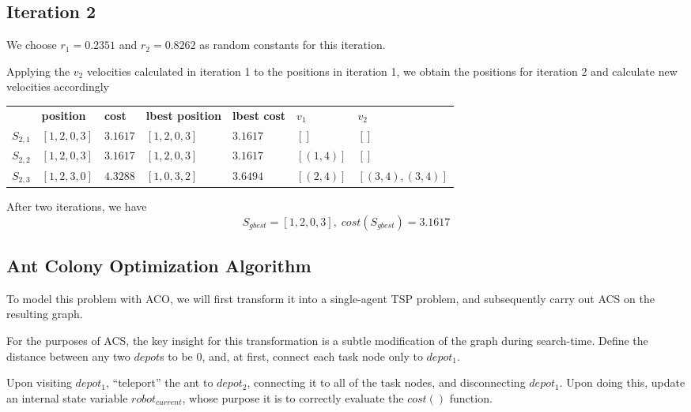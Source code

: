 \documentclass[a4paper]{article}
\begin{document}
\subsection{Iteration 2}

We choose $r_1 = 0.2351$ and $r_2 = 0.8262$ as random constants for this
iteration.

Applying the $v_2$ velocities calculated in iteration 1 to the positions in
iteration 1, we obtain the positions for iteration 2 and calculate new
velocities accordingly
\begin{center}
\begin{tabular}{lllllll}
          & \textbf{position} & \textbf{cost} & \textbf{lbest position} & \textbf{lbest cost} & $v_1$      & $v_2$            \\
$S_{2,1}$ & $[1, 2, 0, 3]$    & $3.1617$      & $[1, 2, 0, 3]$          & $3.1617$            & $[]      $ & $[]$             \\
$S_{2,2}$ & $[1, 2, 0, 3]$    & $3.1617$      & $[1, 2, 0, 3]$          & $3.1617$            & $[(1, 4)]$ & $[]$             \\
$S_{2,3}$ & $[1, 2, 3, 0]$    & $4.3288$      & $[1, 0, 3, 2]$          & $3.6494$            & $[(2, 4)]$ & $[(3,4), (3,4)]$ \\
\end{tabular}
\end{center}
\vspace{1.5em}

After two iterations, we have
$$S_\mathit{gbest} = [1, 2, 0, 3], \; cost(S_\mathit{gbest}) = 3.1617$$

\subsection{Ant Colony Optimization Algorithm} %

To model this problem with ACO, we will first transform it into a single-agent
TSP problem, and subsequently carry out ACS on the resulting graph.

For the purposes of ACS, the key insight for this transformation is a subtle
modification of the graph during search-time. Define the distance between any
two $depot$s to be 0, and, at first, connect each task node only to $depot_1$.

Upon visiting $depot_1$, ``teleport'' the ant to $depot_2$, connecting it to all
of the task nodes, and disconnecting $depot_1$. Upon doing this, update an
internal state variable $robot_{current}$, whose purpose it is to correctly
evaluate the $cost()$ function.
\end{document}

